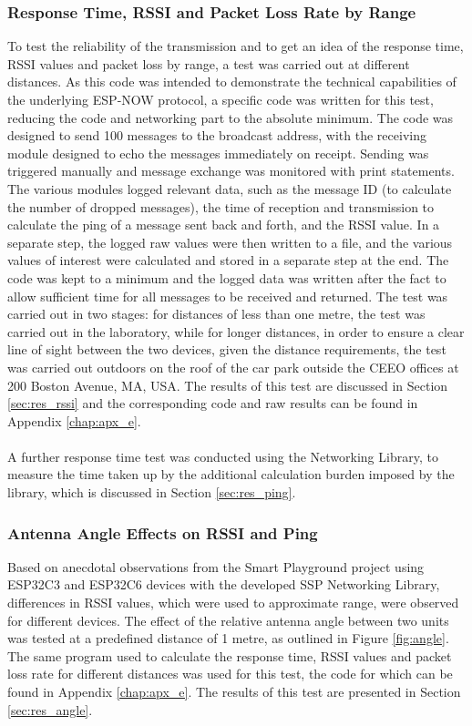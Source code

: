 \subsubsection{\label{sec:methods_test_rssi}Response Time, RSSI and Packet Loss Rate by Range}
To test the reliability of the transmission and to get an idea of the response time, RSSI values and packet loss by range, a test was carried out at different distances. As this code was intended to demonstrate the technical capabilities of the underlying ESP-NOW protocol, a specific code was written for this test, reducing the code and networking part to the absolute minimum. The code was designed to send 100 messages to the broadcast address, with the receiving module designed to echo the messages immediately on receipt. Sending was triggered manually and message exchange was monitored with print statements. The various modules logged relevant data, such as the message ID (to calculate the number of dropped messages), the time of reception and transmission to calculate the ping of a message sent back and forth, and the RSSI value. In a separate step, the logged raw values were then written to a file, and the various values of interest were calculated and stored in a separate step at the end. The code was kept to a minimum and the logged data was written after the fact to allow sufficient time for all messages to be received and returned. The test was carried out in two stages: for distances of less than one metre, the test was carried out in the laboratory, while for longer distances, in order to ensure a clear line of sight between the two devices, given the distance requirements, the test was carried out outdoors on the roof of the car park outside the CEEO offices at 200 Boston Avenue, MA, USA. The results of this test are discussed in Section \ref{sec:res_rssi} and the corresponding code and raw results can be found in Appendix \ref{chap:apx_e}.\\\\
A further response time test was conducted using the Networking Library, to measure the time taken up by the additional calculation burden imposed by the library, which is discussed in Section \ref{sec:res_ping}.

\subsubsection{\label{sec:methods_test_angle}Antenna Angle Effects on RSSI and Ping}
Based on anecdotal observations from the Smart Playground project using ESP32C3 and ESP32C6 devices with the developed SSP Networking Library, differences in RSSI values, which were used to approximate range, were observed for different devices. The effect of the relative antenna angle between two units was tested at a predefined distance of 1 metre, as outlined in Figure \ref{fig:angle}. The same program used to calculate the response time, RSSI values and packet loss rate for different distances was used for this test, the code for which can be found in Appendix \ref{chap:apx_e}. The results of this test are presented in Section \ref{sec:res_angle}.

